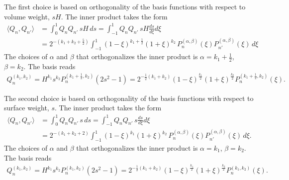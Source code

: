 The first choice is based on orthogonality of the basis functions with respect to volume weight, $sH$. The inner product takes the form
%
\[\begin{aligned}
    \langle Q_n, Q_{n'} \rangle &= \int_{0}^1 Q_n Q_{n'} \, sH \, ds = \int_{-1}^1 Q_n Q_{n'} \, sH \frac{ds}{d\xi} d\xi \\ 
    &= 2^{-\left(k_1 + k_2 + \frac{5}{2}\right)} \int_{-1}^{1} (1 - \xi)^{k_1 + \frac{1}{2}} (1 + \xi)^{k_2} \, P_n^{(\alpha, \beta)}(\xi) P_{n'}^{(\alpha, \beta)}(\xi) \, d\xi
\end{aligned}\]
%
The choices of $\alpha$ and $\beta$ that orthogonalizes the inner product is $\alpha = k_1 + \frac{1}{2}$, $\beta = k_2$. The basis reads
%
\begin{equation}
\begin{aligned}
    Q_n^{(k_1, k_2)} = H^{k_1} s^{k_2} P_n^{(k_1 + \frac{1}{2}, k_2)}(2s^2 - 1) = 2^{-\frac{1}{2}(k_1 + k_2)} (1 - \xi)^{\frac{k_1}{2}} (1 + \xi)^{\frac{k_2}{2}} P_n^{(k_1 + \frac{1}{2}, k_2)}(\xi).
\end{aligned}
\end{equation}
%

The second choice is based on orthogonality of the basis functions with respect to surface weight, $s$. The inner product takes the form
%
\[\begin{aligned}
    \langle Q_n, Q_{n'} \rangle &= \int_{0}^1 Q_n Q_{n'} \, s \, ds = \int_{-1}^1 Q_n Q_{n'} \, s \frac{ds}{d\xi} d\xi \\ 
    &= 2^{-\left(k_1 + k_2 + 2\right)} \int_{-1}^{1} (1 - \xi)^{k_1} (1 + \xi)^{k_2} \, P_n^{(\alpha, \beta)}(\xi) P_{n'}^{(\alpha, \beta)}(\xi) \, d\xi.
\end{aligned}\]
%
The choices of $\alpha$ and $\beta$ that orthogonalizes the inner product is $\alpha = k_1$, $\beta = k_2$. The basis reads
%
\begin{equation}
\begin{aligned}
    Q_n^{(k_1, k_2)} = H^{k_1} s^{k_2} P_n^{(k_1, k_2)}(2s^2 - 1) = 2^{-\frac{1}{2}(k_1 + k_2)} (1 - \xi)^{\frac{k_1}{2}} (1 + \xi)^{\frac{k_2}{2}} P_n^{(k_1, k_2)}(\xi).
\end{aligned}
\end{equation}
%

